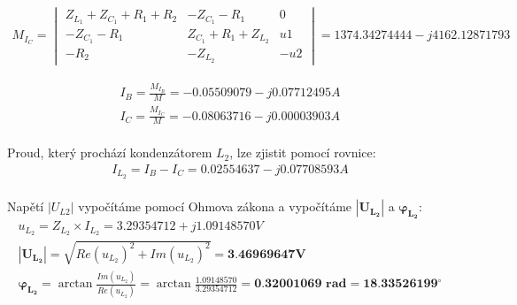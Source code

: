 \begin{gather*}
    M_{I_C} = 
    \begin{vmatrix}
    Z_{L_1} + Z_{C_1} + R_1 + R_2 & -Z_{C_1} - R_1 & 0 \\
    -Z_{C_1} - R_1 & Z_{C_1} + R_1 + Z_{L_2} & u1 \\
    -R_2 & -Z_{L_2} & -u2
    \end{vmatrix}
    =
    1374.34274444 - j4162.12871793
\end{gather*}

\begin{gather*}
    I_B = \frac{M_{I_B}}{M} = -0.05509079 - j0.07712495 A \\
    I_C = \frac{M_{I_C}}{M} = -0.08063716 - j0.00003903 A
\end{gather*}
\\
Proud, který prochází kondenzátorem $L_2$, lze zjistit pomocí rovnice:
\begin{gather*}
    I_{L_2} = I_B - I_C = 0.02554637 - j0.07708593 A
\end{gather*}
\\
Napětí $|U_{L 2}|$ vypočítáme pomocí Ohmova zákona a vypočítáme $\boldsymbol{|U_{L_2}|}$ a $\boldsymbol{\varphi_{L_2}}$:
\begin{gather*}
    u_{L_2} = Z_{L_2} \times I_{L_2} = 3.29354712 + j1.09148570 V \\
    \boldsymbol{|U_{L_2}|} = \sqrt{Re(u_{L_2})^2 + Im(u_{L_2})^2} = \textbf{3.46969647V} \\
    \boldsymbol{\varphi_{L_2}} =
    \arctan \frac{Im(u_{L_2})}{Re(u_{L_2})} =
    \arctan \frac{1.09148570}{3.29354712} =
    \textbf{0.32001069 rad} = \textbf{18.33526199$^{\circ}$}
\end{gather*}